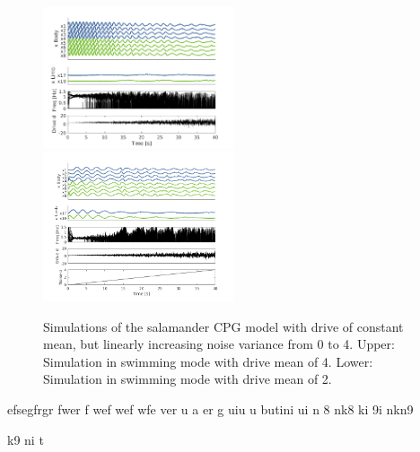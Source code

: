 \documentclass[a4paper]{scrartcl}
\begin{document}
\begin{figure}[!h]
    	\includegraphics[width=0.5\textwidth]{fig/figure7b_drive-increasing-gaussian-swim.png}
	\includegraphics[width=0.5\textwidth]{fig/figure7b_drive-increasing-gaussian-walk.png}
	\caption{Simulations of the salamander CPG model with drive of constant mean, but linearly increasing noise variance from 0 to 4. Upper: Simulation in swimming mode with drive mean of 4. Lower: Simulation in swimming mode with drive mean of 2.}
	\label{fig:7b-drive}
\end{figure}

efsegfrgr fwer f
wef
wef
wfe 
ver
u
a
er
g
uiu
u
butini
ui
n
8
nk8
ki
9i
nkn9

k9
ni
t
\end{document}
